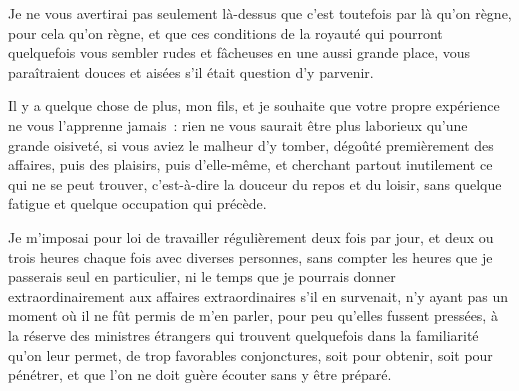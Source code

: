 \documentclass[french,twoside]{book} %
\begin{document}
Je ne vous avertirai pas seulement là-dessus que c’est toutefois par là qu’on règne, pour cela qu’on règne, et que ces conditions de la royauté qui pourront quelquefois vous sembler rudes et fâcheuses en une aussi grande place, vous paraîtraient douces et aisées s’il était question d’y parvenir.\par
Il y a quelque chose de plus, mon fils, et je souhaite que votre propre expérience ne vous l’apprenne jamais : rien ne vous saurait être plus laborieux qu’une grande oisiveté, si vous aviez le malheur d’y tomber, dégoûté premièrement des affaires, puis des plaisirs, puis d’elle-même, et cherchant partout inutilement ce qui ne se peut trouver, c’est-à-dire la douceur du repos et du loisir, sans quelque fatigue et quelque occupation qui précède.\par
Je m’imposai pour loi de travailler régulièrement deux fois par jour, et deux ou trois heures chaque fois avec diverses personnes, sans compter les heures que je passerais seul en particulier, ni le temps que je pourrais donner extraordinairement aux affaires extraordinaires s’il en survenait, n’y ayant pas un moment où il ne fût permis de m’en parler, pour peu qu’elles fussent pressées, à la réserve des ministres étrangers qui trouvent quelquefois dans la familiarité qu’on leur permet, de trop favorables conjonctures, soit pour obtenir, soit pour pénétrer, et que l’on ne doit guère écouter sans y être préparé.\par
\end{document}

